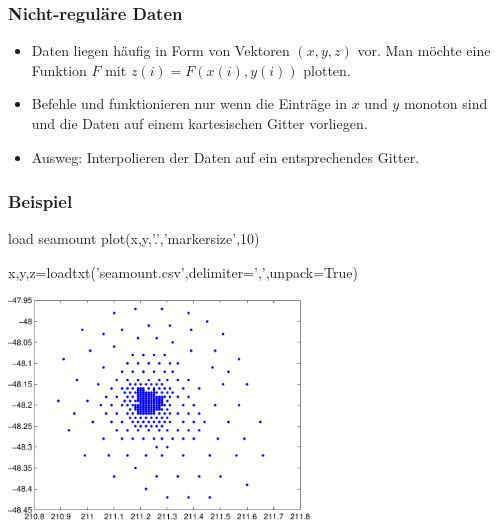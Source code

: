\documentclass[hyperref={xetex}]{beamer}
\begin{document}
%
% 
\begin{frame}[fragile]\frametitle{Nicht-reguläre Daten}
\begin{itemize}
\item Daten liegen h\"aufig in Form von Vektoren $(x,y,z)$ vor. Man m\"ochte
  eine Funktion $F$ mit $z(i) = F(x(i),y(i))$ plotten.
\item Befehle  und  funktionieren nur wenn  die
  Einträge in $x$ und $y$ monoton sind und die Daten auf einem kartesischen
  Gitter vorliegen.
\item Ausweg: Interpolieren der Daten auf ein entsprechendes Gitter. 
\end{itemize}
\end{frame}
%
% 
\begin{frame}[fragile]\frametitle{Beispiel}
\begin{matlabin}
load seamount
plot(x,y,'.','markersize',10)
\end{matlabin}
\begin{pyin}
x,y,z=loadtxt('seamount.csv',delimiter=',',unpack=True)  
\end{pyin}
\begin{center}
\includegraphics[width=0.6\textwidth]{figures/beispiel_scattered_data}
\end{center}
\end{frame}
%
% 
\end{document}
